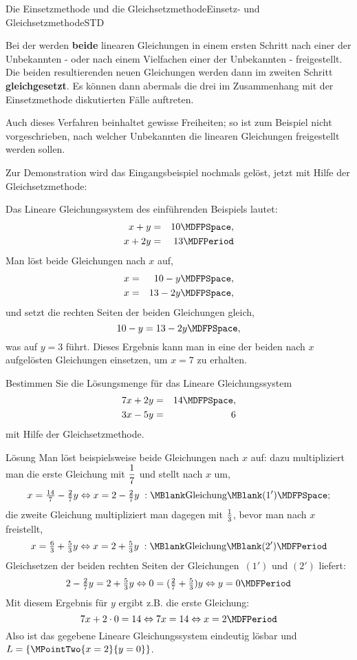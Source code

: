 \begin{MXContent}{Die Einsetzmethode und die Gleichsetzmethode}{Einsetz- und Gleichsetzmethode}{STD}
\begin{MInfo}
Bei der  werden \textbf{beide} linearen Gleichungen in einem ersten
Schritt nach einer der Unbekannten - oder nach einem Vielfachen einer der Unbekannten - freigestellt. Die beiden
resultierenden neuen Gleichungen werden dann im zweiten Schritt \textbf{gleichgesetzt}.
Es können dann abermals die drei im Zusammenhang mit der Einsetzmethode diskutierten Fälle auftreten.
\end{MInfo}
Auch dieses Verfahren beinhaltet gewisse Freiheiten; so ist zum Beispiel nicht vorgeschrieben, nach welcher Unbekannten
die linearen Gleichungen freigestellt werden sollen.

Zur Demonstration wird das Eingangsbeispiel nochmals gelöst, jetzt mit Hilfe der Gleichsetzmethode:
\begin{MExample}
Das Lineare Gleichungssystem des einführenden Beispiels lautet:
\begin{eqnarray*}
x + y & = & 10 \MDFPSpace, \\ x + 2 y & = & 13\MDFPeriod 
\end{eqnarray*}
Man löst beide Gleichungen nach $x$ auf,
\begin{eqnarray*}
x & = & 10 - y\MDFPSpace,  \\ x & = & 13 - 2y \MDFPSpace,
\end{eqnarray*}
und setzt die rechten Seiten der beiden Gleichungen gleich,
$$10 - y = 13 - 2y \MDFPSpace,$$
was auf $y = 3$ führt. Dieses Ergebnis kann man in eine der beiden nach $x$ aufgelösten Gleichungen einsetzen,
um $x = 7$ zu erhalten.
\end{MExample}
\begin{MExercise}
Bestimmen Sie die Lösungsmenge für das Lineare Gleichungssystem
\begin{eqnarray*}
7 x + 2 y &= & 14 \MDFPSpace, \\ 3 x - 5 y & = & 6
\end{eqnarray*}
mit Hilfe der Gleichsetzmethode.
\ \\
\begin{MHint}{Lösung}
Man löst beispielsweise beide Gleichungen nach $x$ auf: dazu multipliziert man die erste Gleichung mit
$\dfrac{1}{7}$ und stellt nach $x$ um,
$$x = \Mtfrac{14}{7} - \Mtfrac27 y \Leftrightarrow x = 2 - \Mtfrac27 y \; : \MBlank\mbox{Gleichung}\MBlank (1') \MDFPSpace ;$$
die zweite Gleichung multipliziert man dagegen mit $\tfrac{1}{3}$, bevor man nach $x$ freistellt,
$$x = \Mtfrac63 + \Mtfrac53 y \Leftrightarrow x = 2 + \Mtfrac53 y \; : \MBlank\mbox{Gleichung}\MBlank (2') \MDFPeriod $$
Gleichsetzen der beiden rechten Seiten der Gleichungen~$(1')$ und $(2')$ liefert:
$$2 - \Mtfrac27 y = 2 + \Mtfrac53 y \Leftrightarrow 0 = (\Mtfrac27 + \Mtfrac53) y \Leftrightarrow y = 0 \MDFPeriod $$
Mit diesem Ergebnis für $y$ ergibt z.B. die erste Gleichung:
$$7 x + 2 \cdot 0 = 14 \Leftrightarrow 7 x = 14 \Leftrightarrow x = 2 \MDFPeriod $$
Also ist das gegebene Lineare Gleichungssystem eindeutig lösbar und ${\ML} = \{ \MPointTwo{x = 2}{y = 0} \}$.


\end{MHint}
\end{MExercise}
\end{MXContent}
